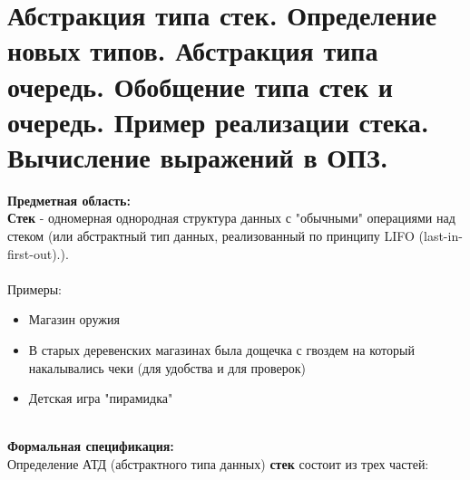 \section{Абстракция типа стек. Определение новых типов. Абстракция типа очередь. Обобщение типа стек и очередь. Пример реализации стека. Вычисление выражений в ОПЗ.}
  \textbf{Предметная область:}\\

  \textbf{Стек} - одномерная однородная структура данных с "обычными" операциями над стеком (или абстрактный тип данных, реализованный по принципу LIFO (last-in-first-out).). \\ \\
  
  Примеры:\\

  \begin{itemize}
    \item Магазин оружия
    \item В старых деревенских магазинах была дощечка с гвоздем на который накалывались чеки (для удобства и для проверок)
    \item Детская игра "пирамидка"
  \end{itemize}\\

  \textbf{Формальная спецификация:}\\

  Определение АТД (абстрактного типа данных) \textbf{стек} состоит из трех частей:\\

